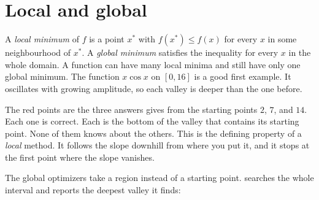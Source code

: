 \section{Local and global}
\label{sec:opt-local-global}

A \emph{local minimum} of \(f\) is a point \(x^*\) with
\(f(x^*) \le f(x)\) for every \(x\) in some neighbourhood of \(x^*\). A
\emph{global minimum} satisfies the inequality for every
\(x\) in the whole domain. A function can have many local minima and still
have only one global minimum. The function \(x\cos x\) on \([0, 16]\) is a
good first example. It oscillates with growing amplitude, so each valley is
deeper than the one before.


The red points are the three answers  gives from the starting
points \(2\), \(7\), and \(14\). Each one is correct. Each is the bottom of the
valley that contains its starting point. None of them knows about the others.
This is the defining property of a \emph{local} method. It follows the slope
downhill from where you put it, and it stops at the first point where the slope
vanishes.

The global optimizers take a region instead of a starting point.
 searches the whole interval and reports the deepest valley it
finds:

\begin{codepairs}
\end{codepairs}

